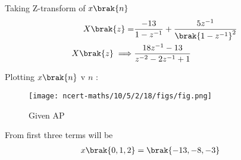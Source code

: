 \documentclass[journal,12pt,twocolumn]{IEEEtran}
\begin{document}
Taking Z-transform of $x\brak{n}$
\begin{align}
X\brak{z} = & \frac{-13}{1 - z^{-1}} + \frac{ 5z^{-1}}{\brak{1 - z^{-1}}^2}\\
X\brak{z}\implies & \frac{18z^{-1} - 13}{z^{-2} - 2z^{-1} + 1}
\end{align}

\pagebreak

Plotting $x\brak{n}$ v $n$ :
\begin{figure}[h]
    \texttt{[image: ncert-maths/10/5/2/18/figs/fig.png]}
    \caption{Given AP}
    \label{fig:10.5.2.18.1}
\end{figure}

From  first three terms will be
\begin{align}
x\brak{0,1,2} &= \brak{-13 , -8 , -3}
\end{align}
\end{document}
